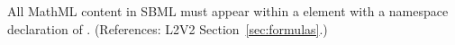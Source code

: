 All MathML content in SBML must appear within a  element
with a namespace declaration of .
(References: L2V2 Section~\ref{sec:formulas}.)
